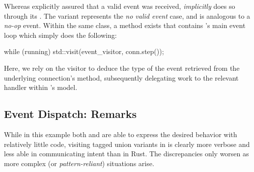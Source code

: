 Whereas \wmrs explicitly assured that a valid event was received, \wmcpp
\textit{implicitly} does so through its . The
 variant represents the \textit{no valid event} case, and
is analogous to a \textit{no-op} event. Within the same class, a method exists
that contains \mbox{\wmcpp}'s main event loop which simply does the following:

\begin{cppblock}
  while (running)
    std::visit(event_visitor, conn.step());
\end{cppblock}

Here, we rely on the visitor to deduce the type of the event retrieved from the
underlying connection's  method, subsequently delegating work to the
relevant handler within \wmcpp's model.

\subsection{Event Dispatch: Remarks}

While in this example both \wmrs and \wmcpp are able to express the desired
behavior with relatively little code, visiting tagged union variants in \cpp
is clearly more verbose and less able in communicating intent than in Rust.
The discrepancies only worsen as more complex (or \textit{pattern-reliant})
situations arise\cite{stdvisitwrong}.
